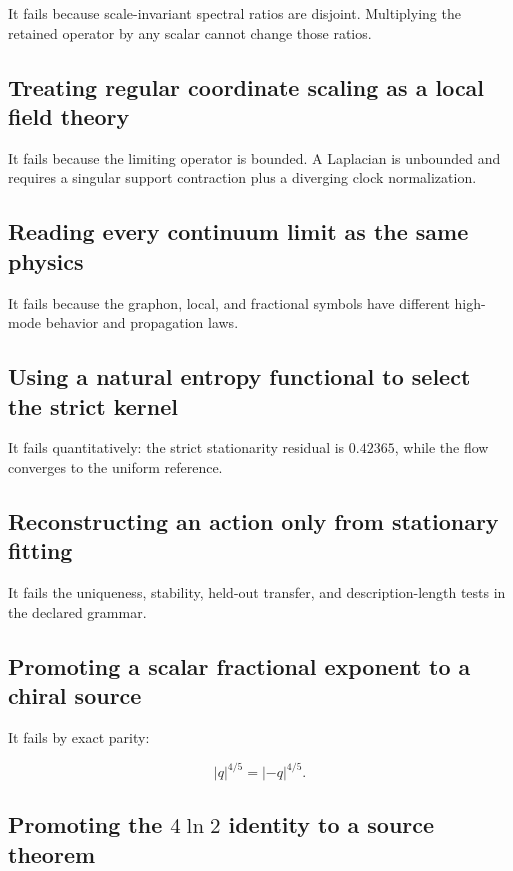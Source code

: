 \documentclass[11pt,a4paper,openany]{report}
\begin{document}
It fails because scale-invariant spectral ratios are disjoint. Multiplying the retained operator by any scalar cannot change those ratios.

\subsection{Treating regular coordinate scaling as a local field theory}

It fails because the limiting operator is bounded. A Laplacian is unbounded and requires a singular support contraction plus a diverging clock normalization.

\subsection{Reading every continuum limit as the same physics}

It fails because the graphon, local, and fractional symbols have different high-mode behavior and propagation laws.

\subsection{Using a natural entropy functional to select the strict kernel}

It fails quantitatively: the strict stationarity residual is \(0.42365\), while the flow converges to the uniform reference.

\subsection{Reconstructing an action only from stationary fitting}

It fails the uniqueness, stability, held-out transfer, and description-length tests in the declared grammar.

\subsection{Promoting a scalar fractional exponent to a chiral source}

It fails by exact parity:

\[
|q|^{4/5}=|-q|^{4/5}.
\]

\subsection{\texorpdfstring{Promoting the \(4\ln2\) identity to a source theorem}{Promoting the 42 identity to a source theorem}}
\end{document}
